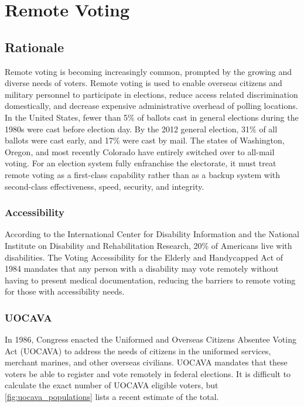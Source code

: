 \chapter{Remote Voting}
\label{chapter:remote_voting}

\section{Rationale}
Remote voting is becoming increasingly common, prompted by the growing
and diverse needs of voters. Remote voting is used to enable overseas
citizens and military personnel to participate in elections, reduce
access related discrimination domestically, and decrease expensive
administrative overhead of polling locations.  In the United States,
fewer than 5\% of ballots cast in general elections during the 1980s
were cast before election day. By the 2012 general election, 31\% of
all ballots were cast early, and 17\% were cast by mail. The states of
Washington, Oregon, and most recently Colorado have entirely switched
over to all-mail voting. For an election system fully enfranchise the
electorate, it must treat remote voting as a first-class capability
rather than as a backup system with second-class effectiveness, speed,
security, and integrity.

\subsection{Accessibility}
According to the International Center for Disability Information and
the National Institute on Disability and Rehabilitation Research, 20\%
of Americans live with disabilities. The Voting Accessibility for the
Elderly and Handycapped Act of 1984 mandates that any person with a
disability may vote remotely without having to present medical
documentation, reducing the barriers to remote voting for those with
accessibility needs.


\subsection{UOCAVA}
In 1986, Congress enacted the Uniformed and Overseas Citizens Absentee
Voting Act (UOCAVA) to address the needs of citizens in the uniformed
services, merchant marines, and other overseas civilians. UOCAVA
mandates that these voters be able to register and vote remotely in
federal elections. It is difficult to calculate the exact number of
UOCAVA eligible voters, but \autoref{fig:uocava_populations} lists a
recent estimate of the total.

